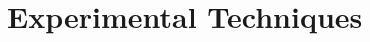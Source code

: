 
\chapter{Experimental Techniques}
\label{chapter:ExperimentalTechniques}

\clearpage{\pagestyle{empty}\cleardoublepage}